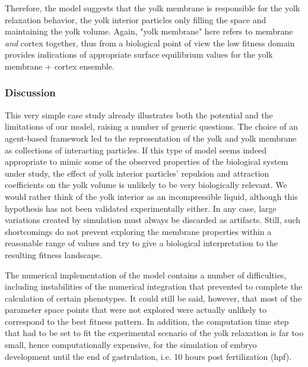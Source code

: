 Therefore, the model suggests that the yolk membrane is responsible for the yolk relaxation behavior, the yolk interior particles only filling the space and maintaining the yolk volume. Again, "yolk membrane" here refers to membrane \textit{and} cortex together, thus from a biological point of view the low fitness domain provides indications of appropriate surface equilibrium values for the yolk membrane + cortex ensemble.


\subsubsection{Discussion}


This very simple case study already illustrates both the potential and the limitations of our model, raising a number of generic questions. The choice of an agent-based framework led to the representation of the yolk and yolk membrane as collections of interacting particles. If this type of model seems indeed appropriate to mimic some of the observed properties of the biological system under study, the effect of yolk interior particles' repulsion and attraction coefficients on the yolk volume is unlikely to be very biologically relevant. We would rather think of the yolk interior as an incompressible liquid, although this hypothesis has not been validated experimentally either. In any case, large variations created by simulation must always be discarded as artifacts. Still, such shortcomings do not prevent exploring the membrane properties within a reasonable range of values and try to give a biological interpretation to the resulting fitness landscape.

The numerical implementation of the model contains a number of difficulties, including instabilities of the numerical integration that prevented to complete the calculation of certain phenotypes. It could still be said, however, that most of the parameter space points that were not explored were actually unlikely to correspond to the best fitness pattern. In addition, the computation time step that had to be set to fit the experimental scenario of the yolk relaxation is far too small, hence computationally expensive, for the simulation of embryo development until the end of gastrulation, i.e. 10 hours post fertilization (hpf).

